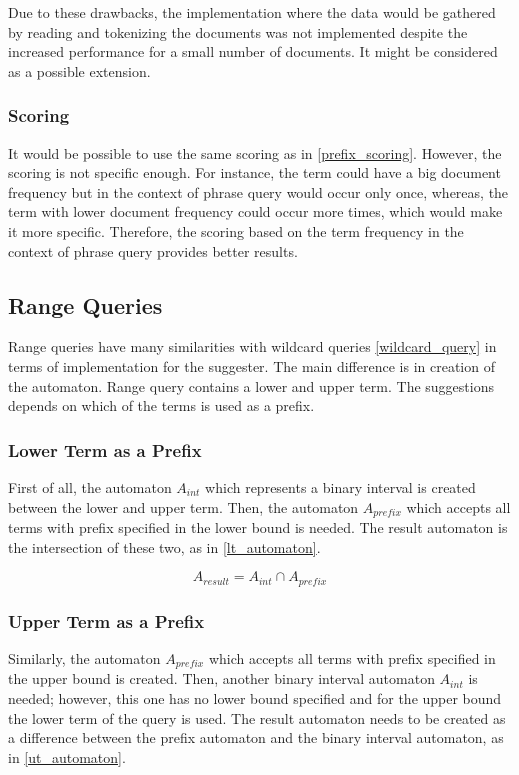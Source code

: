 Due to these drawbacks, the implementation where the data would be gathered by reading and tokenizing the documents was not
implemented despite the increased performance for a small number of documents. It might be considered as a possible
extension.

\subsubsection{Scoring}
It would be possible to use the same scoring as in \ref{prefix_scoring}. However, the scoring is not specific enough.
For instance, the term could have a big document frequency but in the context of phrase query would occur only once,
whereas, the term with lower document frequency could occur more times, which would make it more specific. Therefore,
the scoring based on the term frequency in the context of phrase query provides better results.

\subsection{Range Queries}
Range queries have many similarities with wildcard queries \ref{wildcard_query} in terms of implementation for the
suggester. The main difference is in creation of the automaton. Range query contains a lower and upper term. The
suggestions depends on which of the terms is used as a prefix.

\subsubsection{Lower Term as a Prefix}
First of all, the automaton $A_{int}$ which represents a binary interval is created between the lower and upper term. Then,
the automaton $A_{prefix}$ which accepts all terms with prefix specified in the lower bound is needed. The result automaton is the
intersection of these two, as in \ref{lt_automaton}.

\begin{equation}
\label{lt_automaton}
A_{result} = A_{int} \cap A_{prefix}
\end{equation}

\subsubsection{Upper Term as a Prefix}
Similarly, the automaton $A_{prefix}$ which accepts all terms with prefix specified in the upper bound is created. Then,
another binary interval automaton $A_{int}$ is needed; however, this one has no lower bound specified and for the upper bound the
lower term of the query is used. The result automaton needs to be created as a difference between the prefix automaton
and the binary interval automaton, as in \ref{ut_automaton}.

